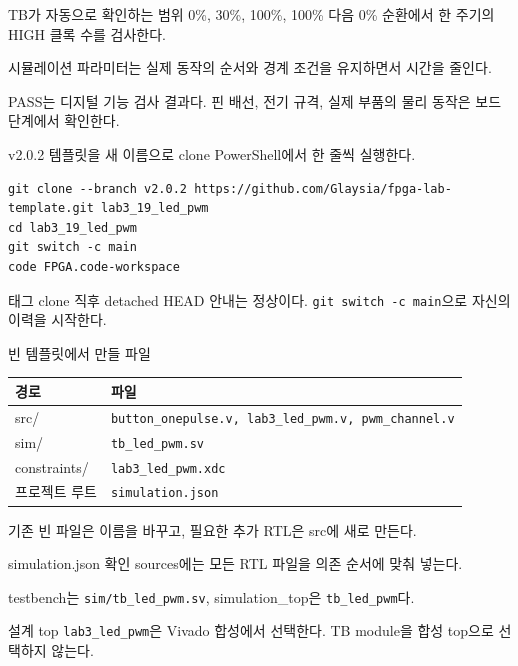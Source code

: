 \begin{frame}{TB가 자동으로 확인하는 범위}
\small
0\%, 30\%, 100\%, 100\% 다음 0\% 순환에서 한 주기의 HIGH 클록 수를 검사한다.\par\vspace{0.28cm}
시뮬레이션 파라미터는 실제 동작의 순서와 경계 조건을 유지하면서 시간을 줄인다.\par\vspace{0.28cm}
PASS는 디지털 기능 검사 결과다. 핀 배선, 전기 규격, 실제 부품의 물리 동작은 보드 단계에서 확인한다.
\end{frame}

\begin{frame}[fragile,label=start]{v2.0.2 템플릿을 새 이름으로 clone}
\small
PowerShell에서 한 줄씩 실행한다.
\begin{lstlisting}[language={}]
git clone --branch v2.0.2 https://github.com/Glaysia/fpga-lab-template.git lab3_19_led_pwm
cd lab3_19_led_pwm
git switch -c main
code FPGA.code-workspace
\end{lstlisting}
태그 clone 직후 detached HEAD 안내는 정상이다. \texttt{git switch -c main}으로 자신의 이력을 시작한다.
\end{frame}

\begin{frame}{빈 템플릿에서 만들 파일}
\small
\begin{center}\renewcommand{\arraystretch}{1.35}\begin{tabular}{>{\raggedright\arraybackslash}p{2.25cm}p{7.2cm}}
경로 & 파일\\\hline
src/ & \texttt{button\_onepulse.v, lab3\_led\_pwm.v, pwm\_channel.v}\\
sim/ & \texttt{tb\_led\_pwm.sv}\\
constraints/ & \texttt{lab3\_led\_pwm.xdc}\\
프로젝트 루트 & \texttt{simulation.json}\\
\end{tabular}\end{center}
기존 빈 파일은 이름을 바꾸고, 필요한 추가 RTL은 src에 새로 만든다.
\end{frame}

\begin{frame}{simulation.json 확인}
\small
sources에는 모든 RTL 파일을 의존 순서에 맞춰 넣는다.\par\vspace{0.25cm}
testbench는 \texttt{sim/tb\_led\_pwm.sv}, simulation\_top은 \texttt{tb\_led\_pwm}다.\par\vspace{0.25cm}
설계 top \texttt{lab3\_led\_pwm}은 Vivado 합성에서 선택한다. TB module을 합성 top으로 선택하지 않는다.
\end{frame}

